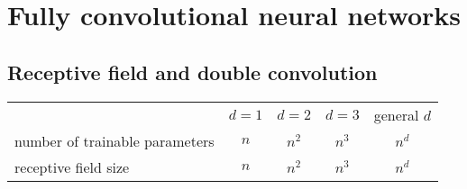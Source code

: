 \documentclass[12pt,a4paper]{article}
\begin{document}
\section{Fully convolutional neural networks}
\subsection{Receptive field and double convolution}


\begin{center}
  \begin{tabular}{lcccc}
                                   & $d=1$ & $d=2$ & $d=3$ & general $d$ \\
    number of trainable parameters & $n$   & $n^2$ & $n^3$ & $n^d$       \\
    receptive field size           & $n$   & $n^2$ & $n^3$ & $n^d$
  \end{tabular}
\end{center}
\end{document}
